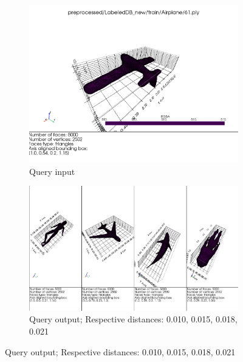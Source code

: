\begin{figure}[H]
    \centering
    \begin{subfigure}[b]{0.3\textwidth}
        \includegraphics[width=\textwidth]{assets/queries/airplane/input.png}
        \caption{Query input}
        \label{fig:query-input-ann-1}
    \end{subfigure}
    \hfill
    \begin{subfigure}[b]{0.65\textwidth}
        \includegraphics[width=\textwidth]{assets/queries/airplane_ann/output.png}
        \caption{Query output; Respective distances: 0.010, 0.015, 0.018, 0.021}
        \label{fig:query-output-ann-1}
    \end{subfigure}
    \hfill
    

\end{figure}
